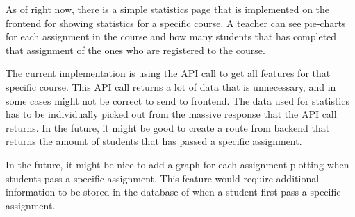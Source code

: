 As of right now, there is a simple statistics page that is implemented on the frontend for showing statistics for a specific course. A teacher can see pie-charts for each assignment in the course and how many students that has completed that assignment of the ones who are registered to the course.

The current implementation is using the API call to get all features for that specific course. This API call returns a lot of data that is unnecessary, and in some cases might not be correct to send to frontend. The data used for statistics has to be individually picked out from the massive response that the API call returns. In the future, it might be good to create a route from backend that returns the amount of students that has passed a specific assignment.

In the future, it might be nice to add a graph for each assignment plotting when students pass a specific assignment. This feature would require additional information to be stored in the database of when a student first pass a specific assignment.
